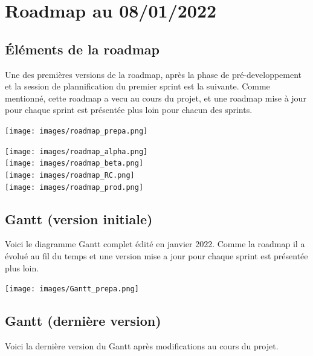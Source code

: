 \section{Roadmap au 08/01/2022}

\subsection{Éléments de la roadmap}

Une des premières versions de la roadmap, après la phase de pré-developpement et la session de 
plannification du premier sprint est la suivante. Comme mentionné, cette roadmap a vecu au cours 
du projet, et une roadmap mise à jour pour chaque sprint est présentée plus loin pour chacun des 
sprints.

\noindent%
\texttt{[image: images/roadmap\_prepa.png]}

\noindent%
\texttt{[image: images/roadmap\_alpha.png]}\\
\texttt{[image: images/roadmap\_beta.png]}\\
\texttt{[image: images/roadmap\_RC.png]}\\
\texttt{[image: images/roadmap\_prod.png]}

\newpage
\subsection{Gantt (version initiale)}

Voici le diagramme Gantt complet édité en janvier 2022. Comme la roadmap il a évolué au fil du temps
 et une version mise a jour pour chaque sprint est présentée plus loin.

\noindent%
\begin{center}
    \texttt{[image: images/Gantt\_prepa.png]}
\end{center}

\newpage
\subsection{Gantt (dernière version)}

Voici la dernière version du Gantt après modifications au cours du projet.

